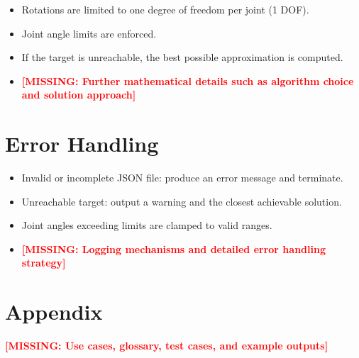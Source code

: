\documentclass[a4paper,11pt]{article}
\newcommand{\missing}[1]{\textbf{\textcolor{red}{[MISSING: #1]}}}
\begin{document}
	\begin{itemize}
		\item Rotations are limited to one degree of freedom per joint (1 DOF).
		\item Joint angle limits are enforced.
		\item If the target is unreachable, the best possible approximation is computed.
		\item \missing{Further mathematical details such as algorithm choice and solution approach}
	\end{itemize}
	
	\section{Error Handling}
	
	\begin{itemize}
		\item Invalid or incomplete JSON file: produce an error message and terminate.
		\item Unreachable target: output a warning and the closest achievable solution.
		\item Joint angles exceeding limits are clamped to valid ranges.
		\item \missing{Logging mechanisms and detailed error handling strategy}
	\end{itemize}
	
	\section{Appendix}
	
	\missing{Use cases, glossary, test cases, and example outputs}
	
\end{document}
